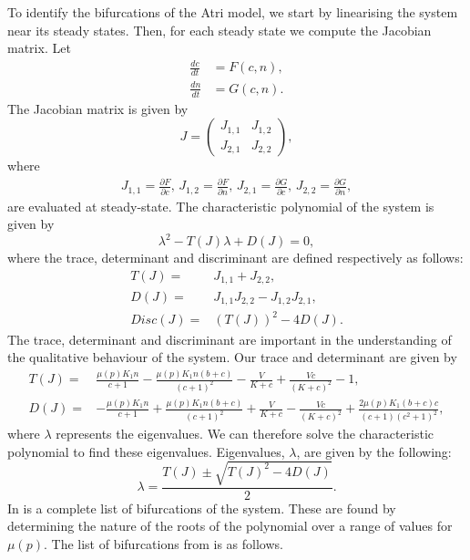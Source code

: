 To identify the bifurcations of the Atri model, we start by linearising the system near its
steady states. Then, for each steady state we compute the Jacobian matrix. Let
\begin{align}
    \frac{dc}{dt}&=F(c,n),\nonumber\\
    \frac{dn}{dt}&=G(c,n).\nonumber
\end{align}
The Jacobian matrix is given by
\begin{equation*}
J = 
\begin{pmatrix}
J_{1,1} & J_{1,2}\\
J_{2,1} & J_{2,2}
\end{pmatrix},
\end{equation*}
where
\begin{align}
J_{1,1}=\frac{\partial F}{\partial c}\text{,  } J_{1,2}=\frac{\partial F}{\partial n}\text{,  } J_{2,1}=\frac{\partial G}{\partial c}\text{,  } J_{2,2}=\frac{\partial G}{\partial n},\nonumber
\end{align}
are evaluated at steady-state. The characteristic polynomial of the system is given by
\begin{equation}
    \lambda^2-T(J)\lambda+D(J)=0,\nonumber
\end{equation}
where the trace, determinant and discriminant are defined respectively as follows:
\begin{align}
    T(J)=&J_{1,1}+J_{2,2},\nonumber\\
    D(J)=&J_{1,1}J_{2,2}-J_{1,2}J_{2,1},\nonumber\\
    Disc(J)=&(T(J))^2-4D(J).\nonumber
\end{align}
The trace, determinant and discriminant are important in the understanding of the qualitative behaviour of the system. Our trace and determinant are given by
\begin{align}
T(J)=&\frac{\mu (p)K_1n}{c+1}-\frac{\mu(p)K_1n(b+c)}{(c+1)^2}-\frac{V}{K+c}+\frac{Vc}{(K+c)^2}-1,\nonumber\\
D(J)=&-\frac{\mu(p)K_1n}{c+1}+\frac{\mu(p)K_1n(b+c)}{(c+1)^2}+\frac{V}{K+c}-\frac{Vc}{(K+c)^2}+\frac{2\mu(p)K_1(b+c)c}{(c+1)(c^2+1)^2},\nonumber
\end{align}
where $\lambda$ represents the eigenvalues. We can therefore solve the characteristic polynomial to find these eigenvalues. Eigenvalues, $\lambda$, are given by the following:
\begin{equation}
    \lambda = \frac{T(J) \pm \sqrt{T(J)^2-4D(J)}}{2}.\nonumber
\end{equation}
In  is a complete list of bifurcations of the system. These are found by determining the nature of the roots of the polynomial over a range of values for $\mu(p)$. {The list of bifurcations from  is as follows.}
